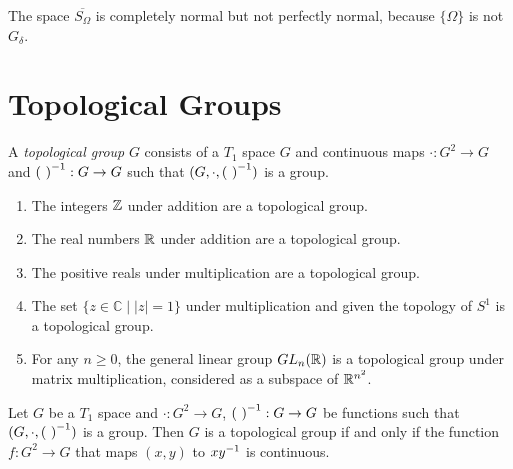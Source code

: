 \begin{example}
    The space $\overline{S_\Omega}$ is completely normal but not perfectly normal,
    because $\{\Omega\}$ is not $G_\delta$.
\end{example}

\chapter{Topological Groups}

\begin{definition}
    A \emph{topological group} $G$ consists of a $T_1$ space $G$ and continuous maps
    $\cdot : G^2 \rightarrow G$ and ${(\ )}^{-1} : G \rightarrow G$ such that $(G, \cdot, \inv{(\ )})$
    is a group.
\end{definition}

\begin{example}
    \begin{enumerate}
        \item The integers $\mathbb{Z}$ under addition are a topological group.
        \item The real numbers $\mathbb{R}$ under addition are a topological group.
        \item The positive reals under multiplication are a topological group.
        \item The set $\{ z \in \mathbb{C} \mid |z| = 1 \}$ under multiplication
        and given the topology of $S^1$ is a topological group.
        \item For any $n \geq 0$, the general linear group $GL_n(\mathbb{R})$ is a topological
        group under matrix multiplication, considered as a subspace of $\mathbb{R}^{n^2}$.
    \end{enumerate}
\end{example}

\begin{lemma}
    Let $G$ be a $T_1$ space and $\cdot : G^2 \rightarrow G$, ${(\ )}^{-1} : G \rightarrow G$
    be functions such that $(G, \cdot, \inv{(\ )})$ is a group. Then $G$ is a
    topological group if and only if the function $f : G^2 \rightarrow G$ that maps
    $(x,y)$ to $x {y}^{-1}$ is continuous.
\end{lemma}

